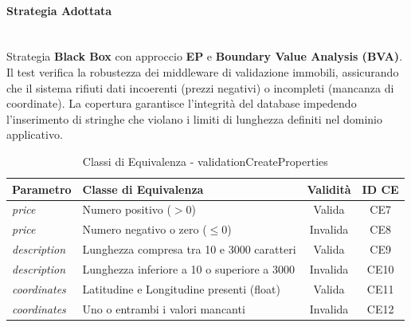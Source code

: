 \documentclass{article}
\begin{document}
\paragraph{Strategia Adottata} \mbox{} \\
Strategia \textbf{Black Box} con approccio \textbf{EP} e \textbf{Boundary Value Analysis (BVA)}. Il test verifica la robustezza dei middleware di validazione immobili, assicurando che il sistema rifiuti dati incoerenti (prezzi negativi) o incompleti (mancanza di coordinate). La copertura garantisce l'integrità del database impedendo l'inserimento di stringhe che violano i limiti di lunghezza definiti nel dominio applicativo.

\newpage

\begin{table}[H]
    \centering
    \caption{Classi di Equivalenza - validationCreateProperties}
    \begin{tabularx}{\textwidth}{|l|X|c|c|}
        \hline
        \rowcolor{DarkBlue}
        \textbf{\color{white}Parametro} & \textbf{\color{white}Classe di Equivalenza} & \textbf{\color{white}Validità} & \textbf{\color{white}ID CE} \\ \hline
        \rowcolor[gray]{0.95}
        \textit{price}                  & Numero positivo ($> 0$)                     & Valida                         & CE7                         \\ \hline
        \textit{price}                  & Numero negativo o zero ($\le 0$)            & Invalida                       & CE8                         \\ \hline
        \rowcolor[gray]{0.95}
        \textit{description}            & Lunghezza compresa tra 10 e 3000 caratteri  & Valida                         & CE9                         \\ \hline
        \textit{description}            & Lunghezza inferiore a 10 o superiore a 3000 & Invalida                       & CE10                        \\ \hline
        \rowcolor[gray]{0.95}
        \textit{coordinates}            & Latitudine e Longitudine presenti (float)   & Valida                         & CE11                        \\ \hline
        \textit{coordinates}            & Uno o entrambi i valori mancanti            & Invalida                       & CE12                        \\ \hline
    \end{tabularx}
\end{table}
\end{document}
